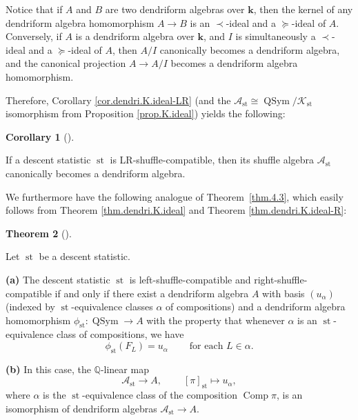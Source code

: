 \documentclass[numbers=enddot,12pt,final,onecolumn,notitlepage]{scrartcl}%
\theoremstyle{definition}
\newtheorem{theo}{Theorem}[section]
\newenvironment{theorem}[1][]
{\begin{theo}[#1]\begin{leftbar}}
{\end{leftbar}\end{theo}}
\newtheorem{coro}[theo]{Corollary}
\newenvironment{corollary}[1][]
{\begin{coro}[#1]\begin{leftbar}}
{\end{leftbar}\end{coro}}
\newenvironment{vershort}{}{}
\begin{document}
\begin{vershort}
Notice that if $A$ and $B$ are two dendriform algebras over $\mathbf{k}$, then
the kernel of any dendriform algebra homomorphism $A\rightarrow B$ is an
$\left.  \prec\right.  $-ideal and a $\left.  \succeq\right.  $-ideal of $A$.
Conversely, if $A$ is a dendriform algebra over $\mathbf{k}$, and $I$ is
simultaneously a $\left.  \prec\right.  $-ideal and a $\left.  \succeq
\right.  $-ideal of $A$, then $A/I$ canonically becomes a dendriform algebra,
and the canonical projection $A\rightarrow A/I$ becomes a dendriform algebra homomorphism.

Therefore, Corollary \ref{cor.dendri.K.ideal-LR} (and the $\mathcal{A}%
_{\operatorname*{st}}\cong\operatorname*{QSym}/\mathcal{K}_{\operatorname*{st}%
}$ isomorphism from Proposition \ref{prop.K.ideal}) yields the following:

\begin{corollary}
If a descent statistic $\operatorname*{st}$ is LR-shuffle-compatible, then its
shuffle algebra $\mathcal{A}_{\operatorname*{st}}$ canonically becomes a
dendriform algebra.
\end{corollary}

We furthermore have the following analogue of Theorem~\ref{thm.4.3}, which
easily follows from Theorem \ref{thm.dendri.K.ideal} and Theorem
\ref{thm.dendri.K.ideal-R}:

\begin{theorem}
\label{thm.dendri.4.3}Let $\operatorname*{st}$ be a descent statistic.

\textbf{(a)} The descent statistic $\operatorname*{st}$ is
left-shuffle-compatible and right-shuffle-compatible if and only if there
exist a dendriform algebra $A$ with
basis $\left(  u_{\alpha}\right)  $ (indexed by $\operatorname*{st}%
$-equivalence classes $\alpha$ of compositions)
and a dendriform algebra homomorphism
$\phi_{\operatorname*{st}}:\operatorname*{QSym} \rightarrow A$
with the property that whenever $\alpha$ is an
$\operatorname{st}$-equivalence class of compositions, we have
\[
\phi_{\operatorname*{st}}\left(  F_{L}\right)  =u_{\alpha}%
\ \ \ \ \ \ \ \ \ \ \text{for each }L\in\alpha.
\]

\textbf{(b)} In this case, the $\mathbb{Q}$-linear map%
\[
\mathcal{A}_{\operatorname*{st}}\rightarrow A,\ \ \ \ \ \ \ \ \ \ \left[
\pi\right]  _{\operatorname*{st}}\mapsto u_{\alpha},
\]
where $\alpha$ is the $\operatorname*{st}$-equivalence class of the
composition $\operatorname*{Comp}\pi$, is an isomorphism of dendriform
algebras $\mathcal{A}_{\operatorname*{st}}\rightarrow A$.
\end{theorem}


\end{vershort}
\end{document}
